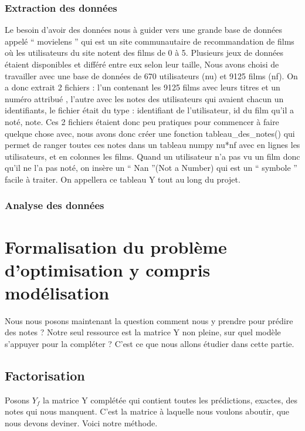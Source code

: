 \documentclass[a4paper,10pt]{article}
\begin{document}
\subsubsection{Extraction des données}
Le besoin d'avoir des données nous à guider vers une grande base de données appelé `` movielens '' qui est un site communautaire de recommandation de films où les utilisateurs du site notent des films de 0 à 5. 
Plusieurs jeux de données étaient disponibles et différé entre eux selon leur taille, 
Nous avons choisi de travailler avec une base de données de 670 utilisateurs (nu) et 9125 films (nf). 
On a donc extrait 2 fichiers : l’un contenant les 9125 films avec leurs titres et un numéro attribué , 
l’autre avec les notes des utilisateurs qui avaient chacun un identifiants, 
le fichier était du type : identifiant de l’utilisateur, id du film qu’il a noté, note.
Ces 2 fichiers étaient donc peu pratiques pour commencer à faire quelque chose avec, 
nous avons donc créer une fonction tableau\_des\_notes() qui permet de ranger toutes ces notes dans un tableau numpy nu*nf avec en lignes les utilisateurs, 
et en colonnes les films. Quand un utilisateur n’a pas vu un film donc qu’il ne l’a pas noté, 
on insère un `` Nan ''(Not a Number) qui est un `` symbole '' facile à traiter. On appellera ce tableau Y tout au long du projet.

\subsubsection{Analyse des données}
\subsection{}
\section{Formalisation du problème d'optimisation y compris modélisation}

Nous nous posons maintenant la question comment nous y prendre pour prédire des notes ?
Notre seul ressource est la matrice Y non pleine, sur quel modèle s'appuyer pour la compléter ?
C'est ce que nous allons étudier dans cette partie.

\subsection{Factorisation}

Posons $Y_f$ la matrice Y complétée qui contient toutes les prédictions, exactes, des notes qui nous manquent. C'est la matrice à laquelle nous voulons aboutir, que nous devons deviner. Voici notre méthode.\\ 
 
\end{document}
